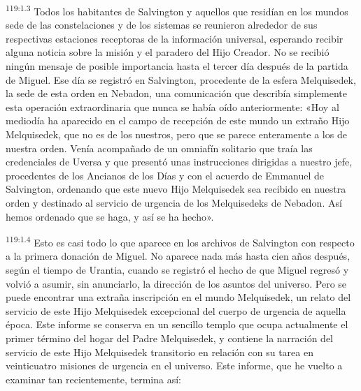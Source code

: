\par
\textsuperscript{119:1.3} Todos los habitantes de Salvington y aquellos que residían en los mundos sede de las constelaciones y de los sistemas se reunieron alrededor de sus respectivas estaciones receptoras de la información universal, esperando recibir alguna noticia sobre la misión y el paradero del Hijo Creador. No se recibió ningún mensaje de posible importancia hasta el tercer día después de la partida de Miguel. Ese día se registró en Salvington, procedente de la esfera Melquisedek, la sede de esta orden en Nebadon, una comunicación que describía simplemente esta operación extraordinaria que nunca se había oído anteriormente: «Hoy al mediodía ha aparecido en el campo de recepción de este mundo un extraño Hijo Melquisedek, que no es de los nuestros, pero que se parece enteramente a los de nuestra orden. Venía acompañado de un omniafín solitario que traía las credenciales de Uversa y que presentó unas instrucciones dirigidas a nuestro jefe, procedentes de los Ancianos de los Días y con el acuerdo de Emmanuel de Salvington, ordenando que este nuevo Hijo Melquisedek sea recibido en nuestra orden y destinado al servicio de urgencia de los Melquisedeks de Nebadon. Así hemos ordenado que se haga, y así se ha hecho».

\par
\textsuperscript{119:1.4} Esto es casi todo lo que aparece en los archivos de Salvington con respecto a la primera donación de Miguel. No aparece nada más hasta cien años después, según el tiempo de Urantia, cuando se registró el hecho de que Miguel regresó y volvió a asumir, sin anunciarlo, la dirección de los asuntos del universo. Pero se puede encontrar una extraña inscripción en el mundo Melquisedek, un relato del servicio de este Hijo Melquisedek excepcional del cuerpo de urgencia de aquella época. Este informe se conserva en un sencillo templo que ocupa actualmente el primer término del hogar del Padre Melquisedek, y contiene la narración del servicio de este Hijo Melquisedek transitorio en relación con su tarea en veinticuatro misiones de urgencia en el universo. Este informe, que he vuelto a examinar tan recientemente, termina así:

